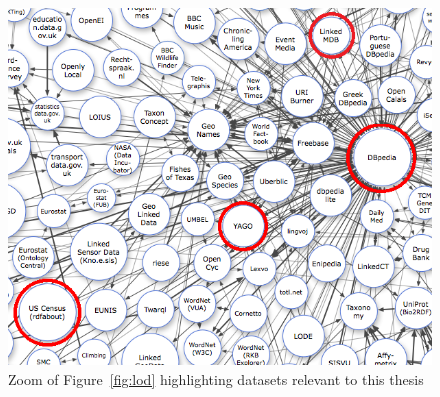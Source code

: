 \begin{figure}[h!]
\label{fig:lodZoom}
\begin{center}
  \includegraphics[width=1\linewidth]{./Figures/lod-zoom.png}
\end{center}
\caption{Zoom of Figure~\ref{fig:lod} highlighting datasets relevant to this thesis}
\end{figure}
